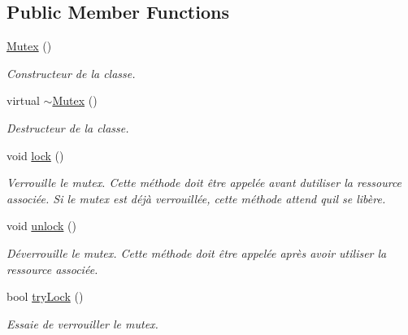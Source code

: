 \subsection*{Public Member Functions}
\begin{DoxyCompactItemize}
\item 
\mbox{\label{classutils_1_1Mutex_a21d056e3bbc8ae4c55321e18262acb2e}} 
\hyperlink{classutils_1_1Mutex_a21d056e3bbc8ae4c55321e18262acb2e}{Mutex} ()
\begin{DoxyCompactList}\small\item\em Constructeur de la classe. \end{DoxyCompactList}\item 
\mbox{\label{classutils_1_1Mutex_acd5acd63bf71c8fd8f4a7ee2d22a4b3a}} 
virtual \hyperlink{classutils_1_1Mutex_acd5acd63bf71c8fd8f4a7ee2d22a4b3a}{$\sim$\+Mutex} ()
\begin{DoxyCompactList}\small\item\em Destructeur de la classe. \end{DoxyCompactList}\item 
\mbox{\label{classutils_1_1Mutex_aa584b418a5ef484f76b93e361a1d7e32}} 
void \hyperlink{classutils_1_1Mutex_aa584b418a5ef484f76b93e361a1d7e32}{lock} ()
\begin{DoxyCompactList}\small\item\em Verrouille le mutex. Cette méthode doit être appelée avant d\textquotesingle{}utiliser la ressource associée. Si le mutex est déjà verrouillée, cette méthode attend qu\textquotesingle{}il se libère. \end{DoxyCompactList}\item 
\mbox{\label{classutils_1_1Mutex_a59b2079dc7f803d49f78ac9c04406cd3}} 
void \hyperlink{classutils_1_1Mutex_a59b2079dc7f803d49f78ac9c04406cd3}{unlock} ()
\begin{DoxyCompactList}\small\item\em Déverrouille le mutex. Cette méthode doit être appelée après avoir utiliser la ressource associée. \end{DoxyCompactList}\item 
bool \hyperlink{classutils_1_1Mutex_afc40847f9465a3482885099aba452b68}{try\+Lock} ()
\begin{DoxyCompactList}\small\item\em Essaie de verrouiller le mutex. \end{DoxyCompactList}\end{DoxyCompactItemize}


